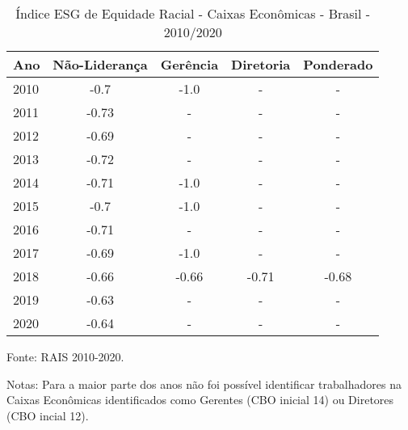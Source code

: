 \begin{table}[htb!]
\centering
\caption{Índice ESG de Equidade Racial - Caixas Econômicas - Brasil - 2010/2020}
\begin{tabular}{lcccc}
\hline
    Ano  & Não-Liderança  & Gerência & Diretoria & Ponderado \\ \hline
    2010 & -0.7           & -1.0     & -         & -         \\  
    2011 & -0.73          & -        & -         & -         \\   
    2012 & -0.69          & -        & -         & -         \\   
    2013 & -0.72          & -        & -         & -         \\   
    2014 & -0.71          & -1.0     & -         & -         \\  
    2015 & -0.7           & -1.0     & -         & -         \\  
    2016 & -0.71          & -        & -         & -         \\   
    2017 & -0.69          & -1.0     & -         & -         \\   
    2018 & -0.66          & -0.66    & -0.71     & -0.68     \\
    2019 & -0.63          & -        & -         & -         \\   
    2020 & -0.64          & -        & -         & -         \\ \hline
\end{tabular}
\begin{floatnotes}
\item [Fonte:] RAIS 2010-2020.
\item [Notas: ] Para a maior parte dos anos não foi possível identificar trabalhadores na Caixas Econômicas identificados como Gerentes (CBO inicial 14) ou Diretores (CBO incial 12).
\end{floatnotes}
\end{table}